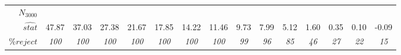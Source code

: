 {{\begin{tabular}{rrrrrrrrrrrrrrr}
\boldmath{}\textbf{$N_{3000}$}\unboldmath{} &       &       &       &       &       &       &       &       &       &       &       &       &       &  \\
$\hat {stat}$ & \multicolumn{1}{c}{47.87} & \multicolumn{1}{c}{37.03} & \multicolumn{1}{c}{27.38} & \multicolumn{1}{c}{21.67} & \multicolumn{1}{c}{17.85} & \multicolumn{1}{c}{14.22} & \multicolumn{1}{c}{11.46} & \multicolumn{1}{c}{9.73} & \multicolumn{1}{c}{7.99} & \multicolumn{1}{c}{5.12} & \multicolumn{1}{c}{1.60} & \multicolumn{1}{c}{0.35} & \multicolumn{1}{c}{0.10} & \multicolumn{1}{c}{-0.09} \\
$\% reject$ & \multicolumn{1}{c}{\textit{100}} & \multicolumn{1}{c}{\textit{100}} & \multicolumn{1}{c}{\textit{100}} & \multicolumn{1}{c}{\textit{100}} & \multicolumn{1}{c}{\textit{100}} & \multicolumn{1}{c}{\textit{100}} & \multicolumn{1}{c}{\textit{100}} & \multicolumn{1}{c}{\textit{99}} & \multicolumn{1}{c}{\textit{96}} & \multicolumn{1}{c}{\textit{85}} & \multicolumn{1}{c}{\textit{46}} & \multicolumn{1}{c}{\textit{27}} & \multicolumn{1}{c}{\textit{22}} & \multicolumn{1}{c}{\textit{15}} \\
\end{tabular}
\LL}}


